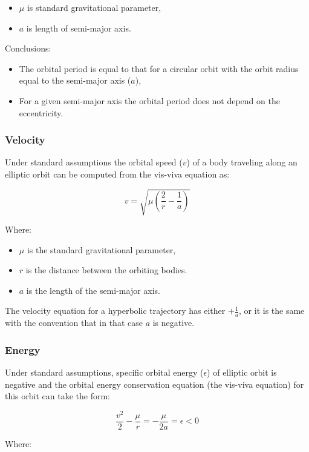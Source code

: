 \documentclass[12pt]{article}
\begin{document}
\begin{itemize}
  \item \(\mu\) is standard gravitational parameter,
  \item \(a\) is length of semi-major axis.
\end{itemize}

Conclusions:

\begin{itemize}
  \item The orbital period is equal to that for a circular orbit with the orbit radius equal to the semi-major axis (\(a\)),
  \item For a given semi-major axis the orbital period does not depend on the eccentricity.
\end{itemize}

\subsubsection{Velocity}

Under standard assumptions the orbital speed (\(v\)) of a body traveling along an elliptic orbit can be computed from the vis-viva equation as:

\[v=\sqrt{\mu\left({\frac{2}{r}-\frac{1}{a}}\right)}\]

Where:

\begin{itemize}
  \item \(\mu\) is the standard gravitational parameter,
  \item \(r\) is the distance between the orbiting bodies.
  \item \(a\) is the length of the semi-major axis.
\end{itemize}

The velocity equation for a hyperbolic trajectory has either \(+\frac{1}{a}\), or it is the same with the convention that in that case \(a\) is negative.

\subsubsection{Energy}

Under standard assumptions, specific orbital energy (\(\epsilon\)) of elliptic orbit is negative and the orbital energy conservation equation (the vis-viva equation) for this orbit can take the form:

\[\frac{v^2}{2}-\frac{\mu}{r}=-\frac{\mu}{2a}=\epsilon<0\]

Where:
\end{document}

